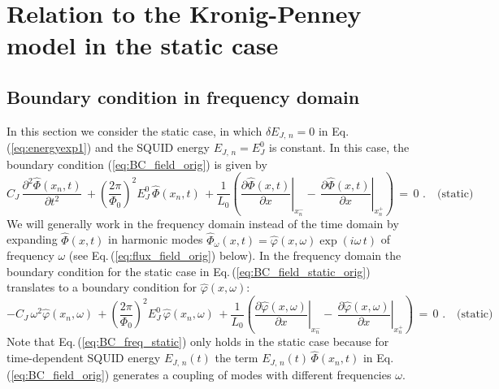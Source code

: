 
\section{Relation to the Kronig-Penney model in the static case} 
\label{sec:kp}

\subsection{Boundary condition in frequency domain}

In this section we consider the static case, in which $\delta E_{J,\,n} = 0$ in Eq.\,(\ref{eq:energyexp1})
and the SQUID energy $E_{J,\,n} = E_J^0$ is constant. In this case, the boundary condition 
(\ref{eq:BC_field_orig}) is given by
%
\begin{equation}\label{eq:BC_field_static_orig}
C_{J} \, \frac{\partial^2 \hat{\Phi}(x_n, t)}{\partial t^2} \, + 
\left(\frac{2 \pi}{\Phi_{0}}\right)^{2} E_J^0 \, \hat{\Phi}(x_n, t) \, + 
\frac{1}{L_{0}}\left(\left.\frac{\partial \hat{\Phi}(x, t)}{\partial x}\right|_{x_n^{-}}
- \, \left.\frac{\partial \hat{\Phi}(x,t)}{\partial x}\right|_{x_n^{+}}\right) \, = \, 0 \, \, . \quad \text{(static)}
\end{equation}
%
We will generally work in the frequency domain instead of the time domain by 
expanding $\hat{\Phi}(x, t)$ in harmonic modes 
$\hat{\Phi}_{\omega}(x, t) = \hat{\varphi}(x,\omega) \exp(i \omega \, t)$ of frequency $\omega$
(see Eq.\,(\ref{eq:flux_field_orig}) below).
In the frequency domain the boundary condition for the static case in Eq.\,(\ref{eq:BC_field_static_orig}) 
translates to a boundary condition for $\hat{\varphi}(x,\omega)$:
%
\begin{equation}\label{eq:BC_freq_static}
- C_{J} \, \omega^2 \hat{\varphi}(x_n, \omega) \, + 
\left(\frac{2 \pi}{\Phi_{0}}\right)^{2} E_J^0 \, \hat{\varphi}(x_n, \omega) \, + 
\frac{1}{L_{0}}\left(\left.\frac{\partial \hat{\varphi}(x, \omega)}{\partial x}\right|_{x_n^{-}}
- \, \left.\frac{\partial \hat{\varphi}(x,\omega)}{\partial x}\right|_{x_n^{+}}\right) \, = \, 0 \, \, .
\quad \text{(static)}
\end{equation}
%
Note that Eq.\,(\ref{eq:BC_freq_static}) only holds in the static case because 
for time-dependent SQUID energy $E_{J,\,n}(t)$ the term $E_{J,\,n}(t) \, \hat{\Phi}(x_n, t)$ 
in Eq.\,(\ref{eq:BC_field_orig}) generates a coupling of modes with different frequencies $\omega$.

